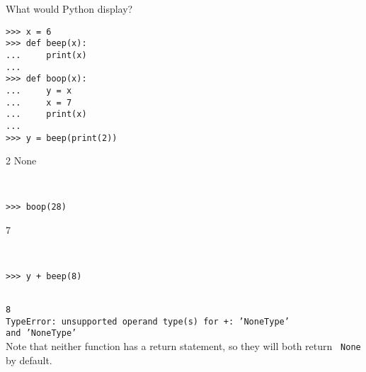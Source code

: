 \question What would Python display?
\begin{lstlisting}
>>> x = 6
>>> def beep(x):
...     print(x)
...
>>> def boop(x):
...     y = x
...     x = 7
...     print(x)
...
>>> y = beep(print(2))
\end{lstlisting}
\begin{solution}

2 \newline
None
\end{solution}
\begin{lstlisting}


>>> boop(28)
\end{lstlisting}
\begin{solution}
7
\end{solution}
\begin{lstlisting}


>>> y + beep(8)
\end{lstlisting}
\begin{solution}
{\tt ~ \\ 8 \\
TypeError: unsupported operand type(s) for +: 'NoneType' \\ and 'NoneType'} \\
Note that neither function has a return statement, so they will both return {\tt
None} by default.
\end{solution}
